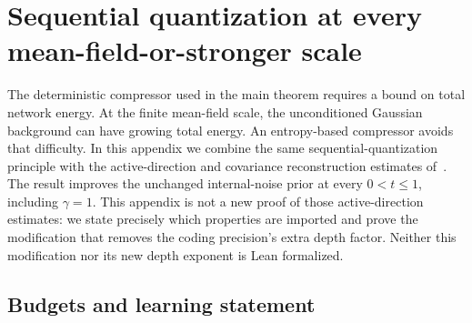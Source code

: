 \section{Sequential quantization at every mean-field-or-stronger scale}
\label{app:all-scales-quantization}

The deterministic compressor used in the main theorem requires a bound
on total network energy. At the finite mean-field scale, the unconditioned
Gaussian background can have growing total energy. An entropy-based
compressor avoids that difficulty. In this appendix we combine the same
sequential-quantization principle with the active-direction and covariance
reconstruction estimates of~\cite{all-scales}. The result improves the
unchanged internal-noise prior at every $0<t\le1$, including $\gamma=1$.
This appendix is not a new proof of those active-direction estimates: we
state precisely which properties are imported and prove the modification
that removes the coding precision's extra depth factor. Neither this
modification nor its new depth exponent is Lean formalized.

\subsection{Budgets and learning statement}

